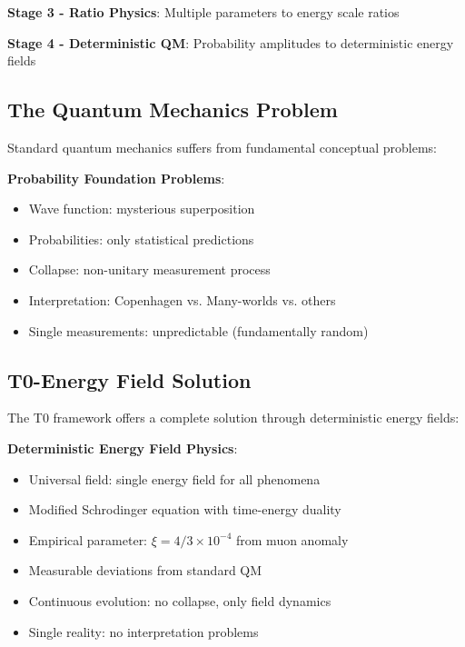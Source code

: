 \documentclass[12pt,a4paper]{article}
\newcommand{\xipar}{\xi}
\begin{document}
	\textbf{Stage 3 - Ratio Physics}: Multiple parameters to energy scale ratios
	
	\textbf{Stage 4 - Deterministic QM}: Probability amplitudes to deterministic energy fields
	
	\subsection{The Quantum Mechanics Problem}
	
	Standard quantum mechanics suffers from fundamental conceptual problems:
	
	\begin{tcolorbox}[colback=red!5!white,colframe=red!75!black,title=Standard QM Problems]
		\textbf{Probability Foundation Problems}:
		\begin{itemize}
			\item Wave function: mysterious superposition
			\item Probabilities: only statistical predictions
			\item Collapse: non-unitary measurement process
			\item Interpretation: Copenhagen vs. Many-worlds vs. others
			\item Single measurements: unpredictable (fundamentally random)
		\end{itemize}
	\end{tcolorbox}
	
	\subsection{T0-Energy Field Solution}
	
	The T0 framework offers a complete solution through deterministic energy fields:
	
	\begin{tcolorbox}[colback=blue!5!white,colframe=blue!75!black,title=T0 Deterministic Foundation]
		\textbf{Deterministic Energy Field Physics}:
		\begin{itemize}
			\item Universal field: single energy field for all phenomena
			\item Modified Schrodinger equation with time-energy duality
			\item Empirical parameter: $\xipar = 4/3 \times 10^{-4}$ from muon anomaly
			\item Measurable deviations from standard QM
			\item Continuous evolution: no collapse, only field dynamics
			\item Single reality: no interpretation problems
		\end{itemize}
	\end{tcolorbox}
	
\end{document}
